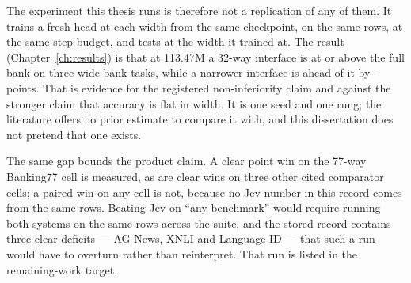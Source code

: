 The experiment this thesis runs is therefore not a replication of any of them. It
trains a fresh head at each width from the same checkpoint, on the same rows, at
the same step budget, and tests at the width it trained at. The result
(Chapter~\ref{ch:results}) is that at 113.47M a 32-way interface is at or above
the full bank on three wide-bank tasks, while a narrower interface is ahead of it
by \ECostTwoToThirtyTwoMin--\ECostTwoToThirtyTwoMax{} points. That is evidence for the registered non-inferiority claim
and against the stronger claim that accuracy is flat in width. It is one seed and
one rung; the literature offers no prior estimate to compare it with, and this
dissertation does not pretend that one exists.

The same gap bounds the product claim. A clear point win on the 77-way
Banking77 cell is measured, as are clear wins on three other cited comparator
cells; a paired win on any cell is not, because no Jev number in this record
comes from the same rows. Beating Jev on ``any benchmark'' would require running
both systems on the same rows across the suite, and the stored record contains
three clear deficits --- AG News, XNLI and Language ID --- that such a run would
have to overturn rather than reinterpret. That run is listed in the remaining-work
target.
